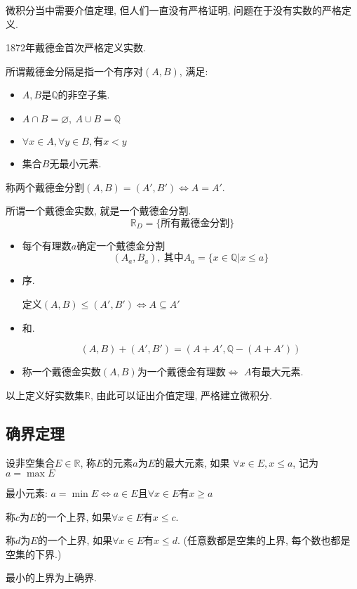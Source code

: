 微积分当中需要介值定理, 但人们一直没有严格证明, 问题在于没有实数的严格定义.

1872年戴德金首次严格定义实数.

\begin{definition}
    所谓戴德金分隔是指一个有序对$(A,B)$, 满足:
    \begin{itemize}
        \item $A,B$是$\mathbb{Q}$的非空子集.
        \item $A \cap B = \varnothing, \ A \cup B = \mathbb{Q}$
        \item $\forall x\in A, \forall y\in B, \text{有} x< y$
        \item 集合$B$无最小元素.
    \end{itemize}

    称两个戴德金分割$(A,B) = (A',B') \iff A = A'$.
\end{definition}

\begin{definition}
    所谓一个戴德金实数, 就是一个戴德金分割.
    \begin{equation}
      \mathbb{R}_{D} = \{\text{所有戴德金分割}\}
    \end{equation}
\end{definition}

\begin{itemize}
    \item 每个有理数$a$确定一个戴德金分割
    \begin{equation}
      (A_a,B_a), \ \text{其中} A_a = \{x\in \mathbb{Q} | x \le a\}
    \end{equation}

    \item 序.

    定义$(A,B) \le  (A',B') \iff A \subseteq A'$
    
    \item 和.
    
    \begin{equation}
      (A,B) + (A',B') = (A+A', \mathbb{Q}-(A+A'))
    \end{equation}

    \item 称一个戴德金实数$(A,B)$为一个戴德金有理数$\iff$ $A$有最大元素.
\end{itemize}

以上定义好实数集$\mathbb{R}$, 由此可以证出介值定理, 严格建立微积分.

\subsection{确界定理}
\begin{definition}
    设非空集合$E\in \mathbb{R}$, 称$E$的元素$a$为$E$的最大元素, 如果
    $\forall x\in E, x\le a$, 记为 $a = \max E$

    最小元素:
    $a =\min E \iff a \in E \text{且} \forall x\in E \text{有} x\ge a$
\end{definition}

\begin{definition}
    称$c$为$E$的一个上界, 如果$\forall x\in E\text{有}x\le c$.

    称$d$为$E$的一个上界, 如果$\forall x\in E\text{有}x\le d$.
    (任意数都是空集的上界, 每个数也都是空集的下界.)

    最小的上界为上确界.
\end{definition}

